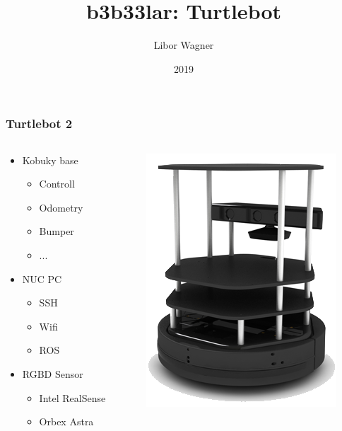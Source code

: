 \documentclass{beamer}
\title{b3b33lar: Turtlebot}
\author{Libor Wagner}
\date{2019}
\begin{document}
\frame{\titlepage}

\begin{frame}
  \frametitle{Turtlebot 2}
  \begin{columns}
    \begin{column}{0.5\textwidth}
      \begin{itemize}
      \item Kobuky base
        \begin{itemize}
        \item Controll
        \item Odometry
        \item Bumper
        \item ...
        \end{itemize}
      \item NUC PC
        \begin{itemize}
        \item SSH
        \item Wifi
        \item ROS
        \end{itemize}
      \item RGBD Sensor
        \begin{itemize}
        \item Intel RealSense
        \item Orbex Astra
        \end{itemize}
      \end{itemize}
    \end{column}
    \begin{column}{0.5\textwidth}
      \begin{center}
        \includegraphics[]{fig/turtlebot_2}
      \end{center}
    \end{column}
  \end{columns}
\end{frame}
\end{document}
